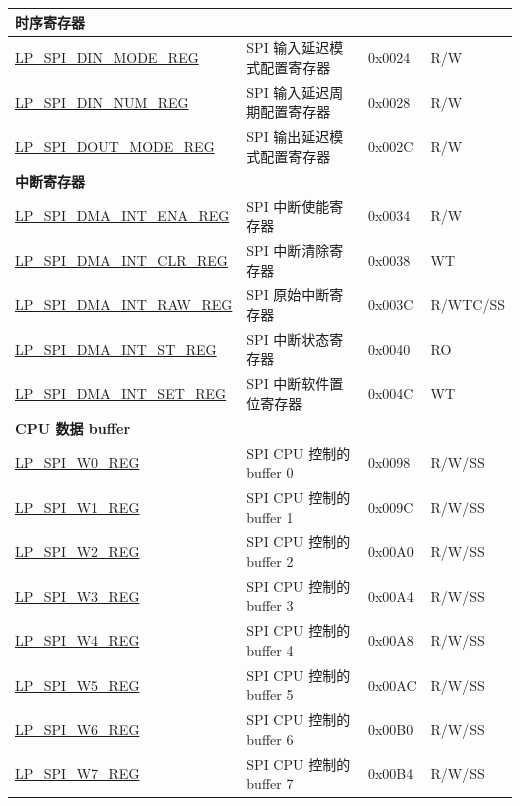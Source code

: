 \begin{longtable}{ | p{6cm} | p{6.6cm} | p{1.3cm} | p{1.7cm} | }
\multicolumn{4}{|l|}{\textbf{时序寄存器}} \\ \hline
\hyperref[regdesc:LPSPIDINMODEREG]{LP\_SPI\_DIN\_MODE\_REG} & SPI 输入延迟模式配置寄存器 & 0x0024 & R/W \\ \hline
\hyperref[regdesc:LPSPIDINNUMREG]{LP\_SPI\_DIN\_NUM\_REG} & SPI 输入延迟周期配置寄存器 & 0x0028 & R/W \\ \hline
\hyperref[regdesc:LPSPIDOUTMODEREG]{LP\_SPI\_DOUT\_MODE\_REG} & SPI 输出延迟模式配置寄存器 & 0x002C & R/W \\ \hline
\multicolumn{4}{|l|}{\textbf{中断寄存器}} \\ \hline
\hyperref[regdesc:LPSPIDMAINTENAREG]{LP\_SPI\_DMA\_INT\_ENA\_REG} & SPI 中断使能寄存器 & 0x0034 & R/W \\ \hline
\hyperref[regdesc:LPSPIDMAINTCLRREG]{LP\_SPI\_DMA\_INT\_CLR\_REG} & SPI 中断清除寄存器 & 0x0038 & WT \\ \hline
\hyperref[regdesc:LPSPIDMAINTRAWREG]{LP\_SPI\_DMA\_INT\_RAW\_REG} & SPI 原始中断寄存器 & 0x003C & R/WTC/SS \\ \hline
\hyperref[regdesc:LPSPIDMAINTSTREG]{LP\_SPI\_DMA\_INT\_ST\_REG} & SPI 中断状态寄存器 & 0x0040 & RO \\ \hline
\hyperref[regdesc:LPSPIDMAINTSETREG]{LP\_SPI\_DMA\_INT\_SET\_REG} & SPI 中断软件置位寄存器 & 0x004C & WT \\ \hline
\multicolumn{4}{|l|}{\textbf{CPU 数据 buffer}} \\ \hline
\hyperref[regdesc:LPSPIW0REG]{LP\_SPI\_W0\_REG} & SPI CPU 控制的 buffer 0 & 0x0098 & R/W/SS \\ \hline
\hyperref[regdesc:LPSPIW1REG]{LP\_SPI\_W1\_REG} & SPI CPU 控制的 buffer 1 & 0x009C & R/W/SS \\ \hline
\hyperref[regdesc:LPSPIW2REG]{LP\_SPI\_W2\_REG} & SPI CPU 控制的 buffer 2 & 0x00A0 & R/W/SS \\ \hline
\hyperref[regdesc:LPSPIW3REG]{LP\_SPI\_W3\_REG} & SPI CPU 控制的 buffer 3 & 0x00A4 & R/W/SS \\ \hline
\hyperref[regdesc:LPSPIW4REG]{LP\_SPI\_W4\_REG} & SPI CPU 控制的 buffer 4 & 0x00A8 & R/W/SS \\ \hline
\hyperref[regdesc:LPSPIW5REG]{LP\_SPI\_W5\_REG} & SPI CPU 控制的 buffer 5 & 0x00AC & R/W/SS \\ \hline
\hyperref[regdesc:LPSPIW6REG]{LP\_SPI\_W6\_REG} & SPI CPU 控制的 buffer 6 & 0x00B0 & R/W/SS \\ \hline
\hyperref[regdesc:LPSPIW7REG]{LP\_SPI\_W7\_REG} & SPI CPU 控制的 buffer 7 & 0x00B4 & R/W/SS \\ \hline

\end{longtable}
